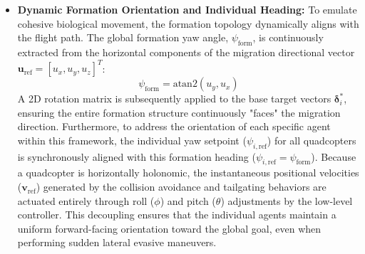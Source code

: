 \documentclass[pdflatex,sn-basic]{sn-jnl}%
\begin{document}
\begin{itemize}
            \item \textbf{Dynamic Formation Orientation and Individual Heading:} To emulate cohesive biological movement, the formation topology dynamically aligns with the flight path. The global formation yaw angle, $\psi_{\text{form}}$, is continuously extracted from the horizontal components of the migration directional vector $\boldsymbol{u}_{\text{ref}} = [u_x, u_y, u_z]^T$:
            \begin{equation}
                \psi_{\text{form}}=\text{atan2}(u_{y},u_{x})
            \end{equation}
            A 2D rotation matrix is subsequently applied to the base target vectors $\boldsymbol{\delta}_{i}^{*}$, ensuring the entire formation structure continuously "faces" the migration direction. Furthermore, to address the orientation of each specific agent within this framework, the individual yaw setpoint ($\psi_{i,\text{ref}}$) for all quadcopters is synchronously aligned with this formation heading ($\psi_{i,\text{ref}} = \psi_{\text{form}}$). Because a quadcopter is horizontally holonomic, the instantaneous positional velocities ($\boldsymbol{v}_{\text{ref}}$) generated by the collision avoidance and tailgating behaviors are actuated entirely through roll ($\phi$) and pitch ($\theta$) adjustments by the low-level controller. This decoupling ensures that the individual agents maintain a uniform forward-facing orientation toward the global goal, even when performing sudden lateral evasive maneuvers.
            
        \end{itemize}
\end{document}
